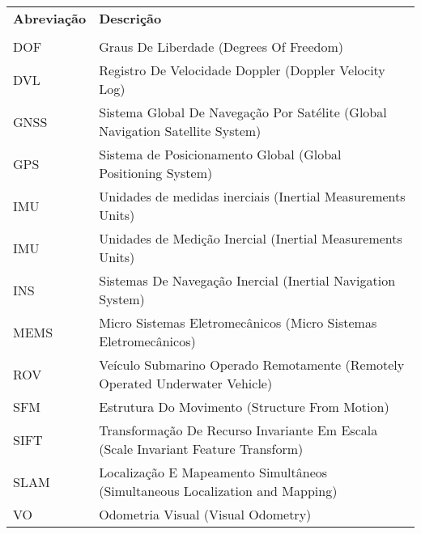 \begin{thesisabbreviations}
\begin{footnotesize}
\begin{longtable}[l]{p{2cm}l}
    \textbf{Abreviação} & \textbf{Descrição} \\ \\
    DOF 	\dotfill & Graus De Liberdade (Degrees Of Freedom) \\
    DVL  	\dotfill & Registro De Velocidade Doppler (Doppler Velocity Log) \\
    GNSS 	\dotfill & Sistema Global De Navegação Por Satélite (Global Navigation Satellite System) \\
    GPS		\dotfill & Sistema de Posicionamento Global (Global Positioning System) \\
    IMU		\dotfill & Unidades de medidas inerciais (Inertial Measurements Units) \\
    IMU		\dotfill & Unidades de Medição Inercial (Inertial Measurements Units) \\
    INS		\dotfill & Sistemas De Navegação Inercial (Inertial Navigation System) \\
    MEMS 	\dotfill & Micro Sistemas Eletromecânicos (Micro Sistemas Eletromecânicos) \\
    ROV		\dotfill & Veículo Submarino Operado Remotamente (Remotely Operated Underwater Vehicle) \\
    SFM 	\dotfill & Estrutura Do Movimento (Structure From Motion) \\
    SIFT 	\dotfill & Transformação De Recurso Invariante Em Escala (Scale Invariant Feature Transform) \\
    SLAM	\dotfill & Localização E Mapeamento Simultâneos (Simultaneous Localization and Mapping) \\
    VO		\dotfill & Odometria Visual (Visual Odometry) \\    
\end{longtable}
\end{footnotesize}
\end{thesisabbreviations}
